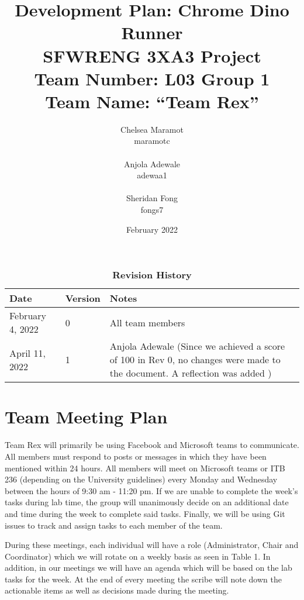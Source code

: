\documentclass{article}
\title{Development Plan: Chrome Dino Runner \\ \bigskip \large SFWRENG 3XA3 Project \\ \bigskip \large Team Number: L03 Group 1 \\ \large Team Name: ``Team Rex'' }
\author{Chelsea Maramot \\ maramotc \\ \\ Anjola Adewale \\ adewaa1 \\ \\ Sheridan Fong \\ fongs7 }
\date{February 2022}
\begin{document}
\maketitle
	
\newpage

\begin{table}[h]
\caption{\bf Revision History}
\begin{tabularx}{\textwidth}{p{3cm}p{2cm}X}
    \toprule {\bf Date} & {\bf Version} & {\bf Notes}\\
    \midrule
    February 4, 2022 & 0 & All team members\\
    \midrule
    April 11, 2022 & 1 & Anjola Adewale (Since we achieved a score of 100 in Rev 0, no changes were made to the document. A reflection was added )\\
    \bottomrule
    
\end{tabularx}
\end{table}


	
	
	\section{Team Meeting Plan}
	
   Team Rex will primarily be using Facebook and Microsoft teams to communicate.
   All members must respond to posts or messages in which they have been mentioned within 24 hours. 
   All members will meet on Microsoft teams or ITB 236 (depending on the University guidelines) every Monday and Wednesday between the hours of 9:30 am - 11:20 pm. 
   If we are unable to complete the week’s tasks during lab time, the group will unanimously decide on an additional date and time during the week to complete said tasks.
   Finally, we will be using Git issues to track and assign tasks to each member of the team.
   
During these meetings, each individual will have a role (Administrator, Chair and Coordinator) which we will rotate on a weekly basis as seen in Table 1. 
In addition, in our meetings we will have an agenda which will be based on the lab tasks for the week. 
At the end of every meeting the scribe will note down the actionable items as well as decisions made during the meeting.
\end{document}

